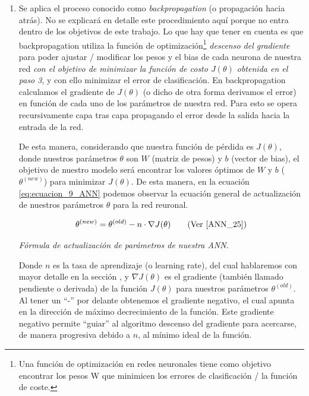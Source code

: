 \documentclass[12pt,a4paper]{article}
\begin{document}
\begin{sloppypar}
\begin{enumerate}
\item Se aplica el proceso conocido como \textit{backpropagation} (o propagación hacia atrás). No se explicará en detalle este procedimiento aquí porque no entra dentro de los objetivos de este trabajo. Lo que hay que tener en cuenta es que backpropagation utiliza la función de optimización\footnote{Una función de optimización en redes neuronales tiene como objetivo encontrar los pesos W que minimicen los errores de clasificación / la función de coste.} \textit{descenso del gradiente} para poder ajustar / modificar los pesos y el bias de cada neurona de nuestra red \textit{con el objetivo de minimizar la función de costo $J(\theta)$ obtenida en el paso 3}, y con ello minimizar el error de clasificación. En backpropagation calculamos el gradiente de $J(\theta)$ (o dicho de otra forma derivamos el error) en función de cada uno de los parámetros de nuestra red. Para esto se opera recursivamente capa tras capa propagando el error desde la salida hacia la entrada de la red.

De esta manera, considerando que nuestra función de pérdida es $J(\theta)$, donde nuestros parámetros $\theta$ son $W$ (matriz de pesos) y $b$ (vector de bias), el objetivo de nuestro modelo será encontrar los valores óptimos de $W$ y $b$ ($\theta^{(new)}$) para minimizar $J(\theta)$. De esta manera, en la ecuación \ref{eq:ecuacion_9_ANN} podemos observar la ecuación general de actualización de nuestros parámetros $\theta$ para la red reuronal.
 
\begin{equation}\label{eq:ecuacion_9_ANN}
\theta^{(new)} = \theta^{(old)} - n \cdot \nabla J(\theta)   \qquad \text{(Ver \cite{ANN_25})}
\end{equation}
\begin{center}
\textit{Fórmula de actualización de parámetros de nuestra ANN.}
\end{center}

Donde $n$ es la tasa de aprendizaje (o learning rate), del cual hablaremos con mayor detalle en la sección \textit{}, y $\nabla J(\theta)$ es el gradiente (también llamado pendiente o derivada) de la función $J(\theta)$ para nuestros parámetros $\theta^{(old)}$. Al tener un “-” por delante obtenemos el gradiente negativo, el cual apunta en la dirección de máximo decrecimiento de la función. Este gradiente negativo permite “guiar” al algoritmo descenso del gradiente para acercarse, de manera progresiva debido a $n$, al mínimo ideal de la función.      


\end{enumerate}
\end{sloppypar}
\end{document}
